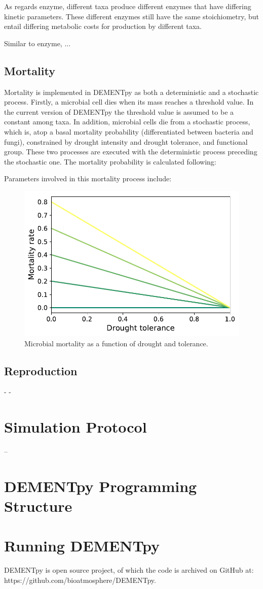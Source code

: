 \documentclass[12pt, oneside, titlepage]{article}   	%
\begin{document}
As regards enzyme, different taxa produce different enzymes that have differing kinetic parameters. These different enzymes still have the same stoichiometry, but entail differing metabolic costs for production by different taxa. 

Similar to enzyme, ...

\subsection{Mortality}
Mortality is implemented in DEMENTpy as both a deterministic and a stochastic process. Firstly, a microbial cell dies when its mass reaches a threshold value. In the current version of DEMENTpy the threshold value is assumed to be a constant among taxa. In addition, microbial cells die from a stochastic process, which is, atop a basal mortality probability (differentiated between bacteria and fungi), constrained by drought intensity and drought tolerance, and functional group. These two processes are executed with the deterministic process preceding the stochastic one. The mortality probability is calculated following:

Parameters involved in this mortality process include:

\begin{figure}[H]
  \centering
  \includegraphics[width=\linewidth]{Fig2_Microbial_mortality_prob.pdf}
  \caption{Microbial mortality as a function of drought and tolerance.}
  \label{fig:mortality}
\end{figure}


\subsection{Reproduction}
-
-



\section{Simulation Protocol}
--

\section{DEMENTpy Programming Structure}




\section{Running DEMENTpy}

DEMENTpy is open source project, of which the code is archived on GitHub at: https://github.com/bioatmosphere/DEMENTpy.
\end{document}

